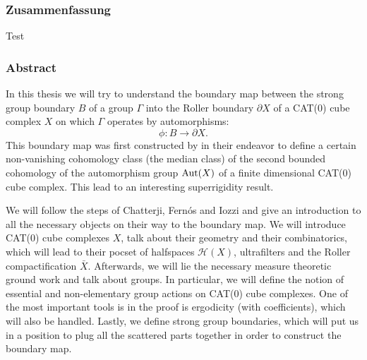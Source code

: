 
\subsubsection*{Zusammenfassung}
%
\label{sec:Zusammenfassung}
Test

\subsubsection*{Abstract}
\label{sec:abstract}

In this thesis we will try to understand the boundary map between the strong group boundary \(B\) of a group \(\Gamma\) into the Roller boundary \(\partial X\) of a CAT(0) cube complex \(X\) on which \(\Gamma\) operates by automorphisms:
\[
  \phi\colon B \to \partial X.
\]
This boundary map was first constructed by \textcite{MR3509968} in their endeavor to define a certain non-vanishing cohomology class (the median class) of the second bounded cohomology of the automorphism group \(\operatorname{Aut}(X)\) of a finite dimensional CAT(0) cube complex. This lead to an interesting superrigidity result.

We will follow the steps of Chatterji, Fernós and Iozzi and give an introduction to all the necessary objects on their way to the boundary map. We will introduce CAT(0) cube complexes \(X\), talk about their geometry and their combinatorics, which will lead to their pocset of halfspaces \(\mathcal{H}(X)\), ultrafilters and the Roller compactification \(\bar X\). Afterwards, we will lie the necessary measure theoretic ground work and talk about groups. In particular, we will define the notion of essential and non-elementary group actions on CAT(0) cube complexes. One of the most important tools is in the proof is ergodicity (with coefficients), which will also be handled. Lastly, we define strong group boundaries, which will put us in a position to plug all the scattered parts together in order to construct the boundary map.

